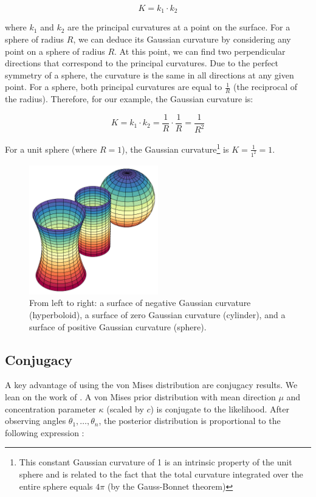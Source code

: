 \documentclass[twoside,11pt]{article}
\begin{document}
$$K = k_1 \cdot k_2$$

where $k_1$ and $k_2$ are the principal curvatures at a point on the surface. For a sphere of radius $R$, we can deduce its Gaussian curvature by considering any point on a sphere of radius $R$. At this point, we can find two perpendicular directions that correspond to the principal curvatures. Due to the perfect symmetry of a sphere, the curvature is the same in all directions at any given point. For a sphere, both principal curvatures are equal to $\frac{1}{R}$ (the reciprocal of the radius). Therefore, for our example, the Gaussian curvature is:

$$K = k_1 \cdot k_2 = \frac{1}{R} \cdot \frac{1}{R} = \frac{1}{R^2}$$

For a unit sphere (where $R = 1$), the Gaussian curvature\footnote{This constant Gaussian curvature of 1 is an intrinsic property of the unit sphere and is related to the fact that the total curvature integrated over the entire sphere equals $4\pi$ (by the Gauss-Bonnet theorem)} is $K = \frac{1}{1^2} = 1$. 

\begin{figure}
  \begin{center}
    \includegraphics[width=0.5\textwidth]{../fig/gaussian-curvature.png}
  \end{center}
  \caption{From left to right: a surface of negative Gaussian curvature (hyperboloid), a surface of zero Gaussian curvature (cylinder), and a surface of positive Gaussian curvature (sphere).}\label{fig:gaussian-curvature}
\end{figure}

\subsection{Conjugacy}

A key advantage of using the von Mises distribution are conjugacy results. We lean on the work of \citet{mardia1976}. A von Mises prior distribution with mean direction $\mu$ and concentration parameter $\kappa$ (scaled by $c$) is conjugate to the likelihood. After observing angles $\theta_1,\ldots,\theta_n$, the posterior distribution is proportional to the following expression \citep{mardia1976}:
\end{document}
